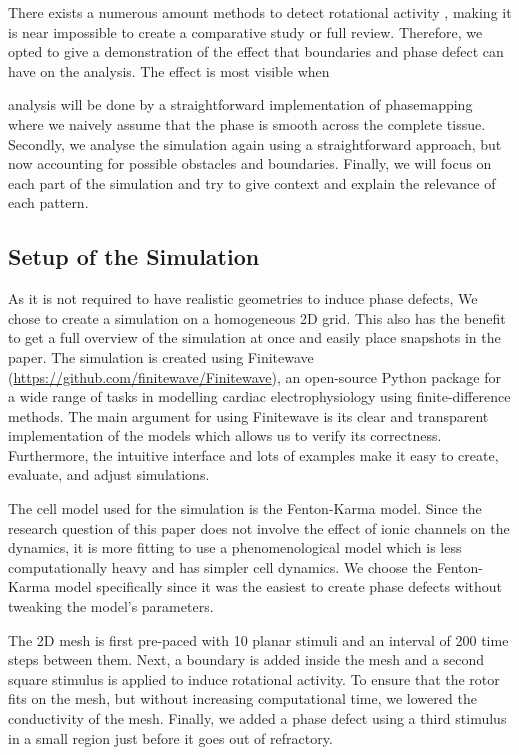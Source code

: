 \documentclass[twocolumn]{article}
\begin{document}
There exists a numerous amount methods to detect rotational activity \autocite{pikunov2023the, gurevich2019robust, li2020standardizing},
making it is near impossible to create a comparative study or full review.
Therefore, we opted to give a demonstration of the effect
that boundaries and phase defect can have on the analysis.
The effect is most visible when

analysis will be done
by a straightforward implementation of phasemapping where we naively assume
that the phase is smooth across the complete tissue.
Secondly, we analyse the simulation again using a straightforward approach,
but now accounting for possible obstacles and boundaries.
Finally, we will focus on each part of the simulation
and try to give context and explain the relevance of each pattern.

\subsection{Setup of the Simulation}\label{setup-of-the-simulation}

As it is not required to have realistic geometries to induce phase
defects, We chose to create a simulation on a homogeneous 2D grid. This
also has the benefit to get a full overview of the simulation at once
and easily place snapshots in the paper.
The simulation is created using Finitewave
(\url{https://github.com/finitewave/Finitewave}), an open-source Python
package for a wide range of tasks in modelling cardiac electrophysiology
using finite-difference methods. The main argument for using Finitewave
is its clear and transparent implementation of the models which allows
us to verify its correctness. Furthermore, the intuitive interface and
lots of examples make it easy to create, evaluate, and adjust
simulations.

The cell model used for the simulation is the Fenton-Karma model. Since
the research question of this paper does not involve the effect of ionic
channels on the dynamics, it is more fitting to use a phenomenological
model which is less computationally heavy and has simpler cell dynamics.
We choose the Fenton-Karma model specifically since it was the easiest
to create phase defects without tweaking the model's parameters.

The 2D mesh is first pre-paced with 10 planar stimuli and an interval of
200 time steps between them. Next, a boundary is added inside the mesh
and a second square stimulus is applied to induce rotational activity.
To ensure that the rotor fits on the mesh, but without increasing
computational time, we lowered the conductivity of the mesh. Finally, we
added a phase defect using a third stimulus in a small region just
before it goes out of refractory.
\end{document}
